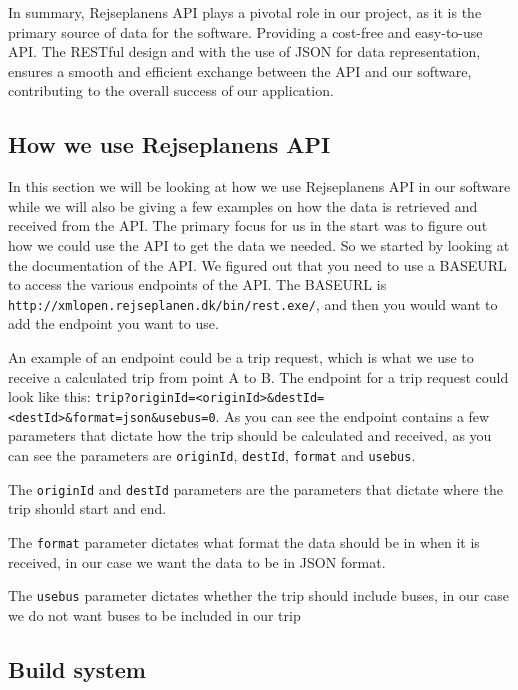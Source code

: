 In summary, Rejseplanens API plays a pivotal role in our project, as it is the primary source of data for the software.
Providing a cost-free and easy-to-use API. The RESTful design and with the use of JSON for data representation, ensures
a smooth and efficient exchange between the API and our software, contributing to the overall success of our
application.

\subsection{How we use Rejseplanens API}\label{subsec:how-we-use-rejseplanens-api}

In this section we will be looking at how we use Rejseplanens API in our software while we will also be giving a few
examples on how the data is retrieved and received from the API\@.
The primary focus for us in the start was to figure out how we could use the API to get the data we needed.
So we started by looking at the documentation of the API\@.
We figured out that you need to use a BASEURL to access the various endpoints of the API\@.
The BASEURL is \lstinline{http://xmlopen.rejseplanen.dk/bin/rest.exe/}, and then you would want to add the endpoint
you want to use.

An example of an endpoint could be a trip request, which is what we use to receive a calculated trip from point A to B.
The endpoint for a trip request could look like this:
\lstinline{trip?originId=<originId>&destId=<destId>&format=json&usebus=0}.
As you can see the endpoint contains a few parameters that dictate how the trip should be calculated and received, as
you can see the parameters are \lstinline{originId}, \lstinline{destId}, \lstinline{format} and \lstinline{usebus}.

The \lstinline{originId} and \lstinline{destId} parameters are the parameters that dictate where the trip should start
and end.

The \lstinline{format} parameter dictates what format the data should be in when it is received, in our case we want
the data to be in JSON format.

The \lstinline{usebus} parameter dictates whether the trip should include buses, in our case we do not want
buses to be included in our trip


\subsection{Build system}\label{subsec:build-system}

